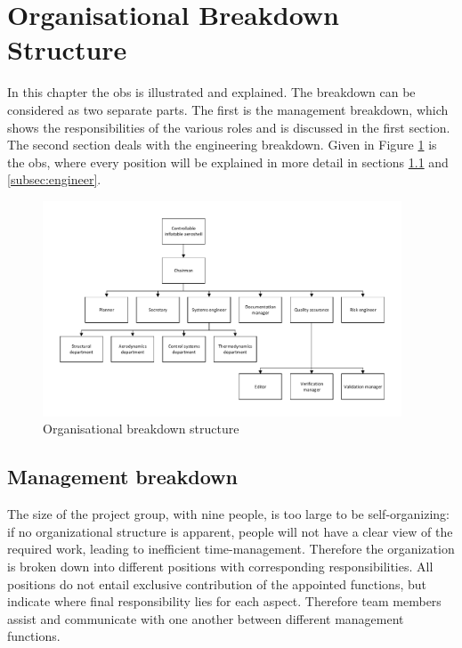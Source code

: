 \section{Organisational Breakdown Structure}\label{cha:OBS}
In this chapter the \gls{obs} is illustrated and explained. The breakdown can be considered as two separate parts. The first is the management breakdown, which shows the responsibilities of the various roles and is discussed in the first section. The second section deals with the engineering breakdown. Given in Figure \ref{fig:OBS} is the \gls{obs}, where every position will be explained in more detail in sections \ref{subsec:management} and \ref{subsec:engineer}.

\begin{figure}[h]
\centering
\includegraphics[width=0.95\textwidth]{./Figure/OBS.pdf}
\caption{Organisational breakdown structure} \label{fig:OBS}
\end{figure}

\subsection{Management breakdown}\label{subsec:management}
The size of the project group, with nine people, is too large to be self-organizing: if no organizational structure is apparent, people will not have a clear view of the required work, leading to inefficient time-management. Therefore the organization is broken down into different positions with corresponding responsibilities. All positions do not entail exclusive contribution of the appointed functions, but indicate where final responsibility lies for each aspect. Therefore team members assist and communicate with one another between different management functions.


